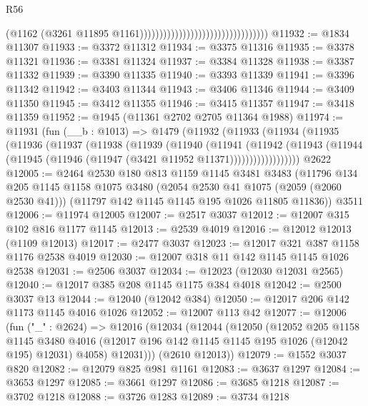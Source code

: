 \begin{lexlean}{R56}
\begin{coremodule}
                                                                  (@1162
                                                                    (@3261
                                                                      @11895
                                                                      @1161)))))))))))))))))))))))))))))))))
@11932 := @1834 @11307
@11933 := @3372 @11312
@11934 := @3375 @11316
@11935 := @3378 @11321
@11936 := @3381 @11324
@11937 := @3384 @11328
@11938 := @3387 @11332
@11939 := @3390 @11335
@11940 := @3393 @11339
@11941 := @3396 @11342
@11942 := @3403 @11344
@11943 := @3406 @11346
@11944 := @3409 @11350
@11945 := @3412 @11355
@11946 := @3415 @11357
@11947 := @3418 @11359
@11952 := @1945 (@11361 @2702 @2705 @11364 @1988)
@11974 := @11931
    (fun (__b : @1013) =>
    @1479
      (@11932
        (@11933
          (@11934
            (@11935
              (@11936
                (@11937
                  (@11938
                    (@11939
                      (@11940
                        (@11941
                          (@11942
                            (@11943
                              (@11944 (@11945 (@11946 (@11947 (@3421 @11952 @11371))))))))))))))))))
    @2622
@12005 := @2464
    @2530
    @180
    @813
    @1159
    @1145
    @3481
    @3483
    (@11796
      @134
      @205
      @1145
      @1158
      @1075
      @3480
      (@2054 @2530 @41 @1075 (@2059 (@2060 @2530 @41)))
      (@11797 @142 @1145 @1145 @195 @1026 @11805 @11836))
    @3511
@12006 := @11974 @12005
@12007 := @2517 @3037
@12012 := @12007 @315 @102 @816 @1177 @1145
@12013 := @2539 @4019
@12016 := @12012 @12013 (@1109 @12013)
@12017 := @2477 @3037
@12023 := @12017 @321 @387 @1158 @1176 @2538 @4019
@12030 := @12007 @318 @11 @142 @1145 @1145 @1026 @2538
@12031 := @2506 @3037
@12034 := @12023 (@12030 @12031 @2565)
@12040 := @12017 @385 @208 @1145 @1175 @384 @4018
@12042 := @2500 @3037 @13
@12044 := @12040 (@12042 @384)
@12050 := @12017 @206 @142 @1173 @1145 @4016 @1026
@12052 := @12007 @113 @42
@12077 := @12006
    (fun ("_" : @2624) =>
    @12016
      (@12034
        (@12044
          (@12050
            (@12052
              @205
              @1158
              @1145
              @3480
              @4016
              (@12017 @196 @142 @1145 @1145 @195 @1026 (@12042 @195) @12031)
              @4058)
            @12031)))
      (@2610 @12013))
@12079 := @1552 @3037 @820
@12082 := @12079 @825 @981 @1161
@12083 := @3637 @1297
@12084 := @3653 @1297
@12085 := @3661 @1297
@12086 := @3685 @1218
@12087 := @3702 @1218
@12088 := @3726 @1283
@12089 := @3734 @1218

\end{coremodule}
\end{lexlean}
